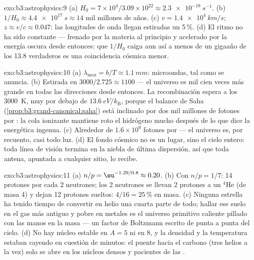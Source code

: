 \begin{solution}{exo:b3:astrophysics:9}
(a) $H_0 = 7\times10^4/3.09\times10^{22} \approx
\qty{2.3e-18}{s^{-1}}$. (b) $1/H_0 \approx \qty{4.4e17}{s}
\approx 14$ mil millones de años. (c) $v = \qty{1.4e4}{km/s}$;
$z \approx v/c \approx 0.047$: las longitudes de onda llegan estiradas
un 5\,\%. (d) El ritmo no ha sido constante --- frenado por la
materia al principio y acelerado por la energía oscura desde entonces: que
$1/H_0$ caiga aun así a menos de un gigaaño de los 13.8 verdaderos es una
coincidencia cósmica menor.
\end{solution}

\begin{solution}{exo:b3:astrophysics:10}
(a) $\lambda_{\text{max}} = b/T \approx \qty{1.1}{mm}$:
microondas, tal como se anuncia. (b) Estirada en $3000/2.725 \approx
1100$ --- el universo es mil cien veces más grande en todas las
direcciones desde entonces. La recombinación espera a los \qty{3000}{K}, muy
por debajo de $\qty{13.6}{eV}/k_{\text{B}}$, porque el balance de Saha
(\cref{prop:b3:grand-canonical:saha}) está inclinado por dos mil millones de
fotones por : la cola ionizante mantiene roto el hidrógeno
mucho después de lo que dice la energética ingenua. (c) Alrededor de
$1.6\times10^{9}$ fotones por  --- el universo es, por
recuento, casi todo luz. (d) El fondo cósmico no es un lugar, sino
el cielo entero: toda línea de visión termina en la niebla de última
dispersión, así que toda antena, apuntada a cualquier sitio, lo recibe.
\end{solution}

\begin{solution}{exo:b3:astrophysics:11}
(a) $n/p = \eu^{-1.29/0.8} \approx 0.20$. (b) Con $n/p = 1/7$:
14 protones por cada 2 neutrones; los 2 neutrones se llevan 2 protones a
un $^4$He (de masa 4) y dejan 12 protones sueltos: $4/16 = 25\,\%$ en
masa. (c) Ninguna estrella ha tenido tiempo de convertir en helio una cuarta parte
de todo; hallar ese suelo en el gas más antiguo y pobre en metales
es el universo primitivo caliente pillado con las manos en la masa --- un factor
de Boltzmann escrito de punta a punta del cielo. (d) No hay núcleo estable
en $A = 5$ ni en $8$, y la densidad y la temperatura estaban
cayendo en cuestión de minutos: el puente hacia el carbono (tres helios a
la vez) solo se abre en los núcleos densos y pacientes de las .
\end{solution}

